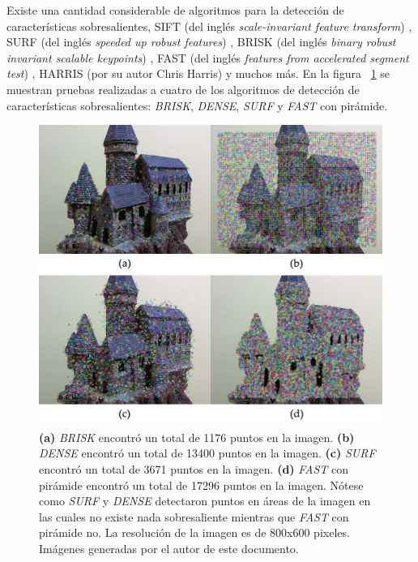 Existe una cantidad considerable de algoritmos para la detecci\'{o}n de caracter\'{i}sticas sobresalientes, SIFT (del ingl\'{e}s \textit{scale-invariant feature transform}) \cite{Lowe_1999}, SURF (del ingl\'{e}s \textit{speeded up robust features}) \cite{Bay_Ess_Tuytelaars_Vangool_2008}, BRISK (del ingl\'{e}s \textit{binary robust invariant scalable keypoints}) \cite{Leutenegger_Chli_Siegwart_2011}, FAST (del ingl\'{e}s \textit{features from accelerated segment test}) \cite{Rosten_Drummond_2006}, HARRIS (por su autor Chris Harris) \cite{Harris_Stephens_1988} y muchos m\'{a}s. En la figura ~\ref{fig:PointDetection1} se muestran pruebas realizadas a cuatro de los algoritmos de detecci\'{o}n de caracter\'{i}sticas sobresalientes: \textit{BRISK}, \textit{DENSE}, \textit{SURF} y \textit{FAST} con pir\'{a}mide.


\begin{figure}[H]
\centering
\includegraphics[width=1.0\textwidth]{images/pointdetection1.png}
\caption[Detecci\'{o}n de caracter\'{i}sticas sobresalientes usando BRISK, DENSE, SURF y FAST con pir\'{a}mide]%
{\textbf{(a)} \textit{BRISK} encontr\'{o} un total de 1176 puntos en la imagen. \textbf{(b)} \textit{DENSE} encontr\'{o} un total de 13400 puntos en la imagen. \textbf{(c)} \textit{SURF} encontr\'{o} un total de 3671 puntos en la imagen. \textbf{(d)} \textit{FAST} con pir\'{a}mide encontr\'{o} un total de 17296 puntos en la imagen. N\'{o}tese como \textit{SURF} y \textit{DENSE} detectaron puntos en \'{a}reas de la imagen en las cuales no existe nada sobresaliente mientras que \textit{FAST} con pir\'{a}mide no. La resoluci\'{o}n de la imagen es de 800x600 pixeles. Im\'{a}genes generadas por el autor de este documento.}
\label{fig:PointDetection1}
\end{figure}


